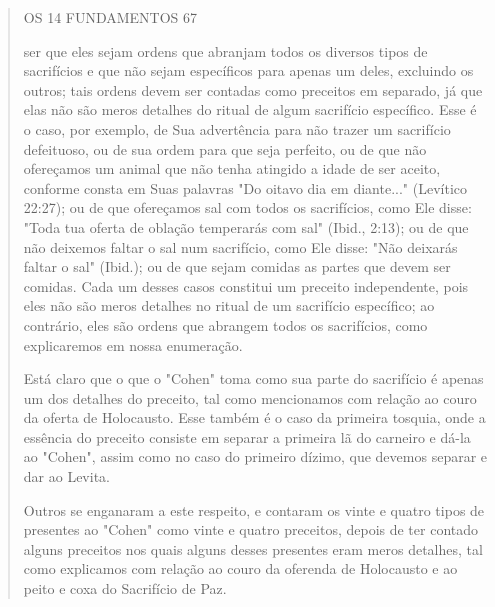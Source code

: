 \begin{quote}
OS 14 FUNDAMENTOS 67

ser que eles sejam ordens que abranjam todos os diversos tipos de
sacrifícios e que não sejam específicos para apenas um deles, excluindo
os outros; tais or­dens devem ser contadas como preceitos em separado,
já que elas não são me­ros detalhes do ritual de algum sacrifício
específico. Esse é o caso, por exem­plo, de Sua advertência para não
trazer um sacrifício defeituoso, ou de sua or­dem para que seja
perfeito, ou de que não ofereçamos um animal que não te­nha atingido a
idade de ser aceito, conforme consta em Suas palavras "Do oita­vo dia em
diante..." (Levítico 22:27); ou de que ofereçamos sal com todos os
sacrifícios, como Ele disse: "Toda tua oferta de oblação temperarás com
sal" (Ibid., 2:13); ou de que não deixemos faltar o sal num sacrifício,
como Ele dis­se: "Não deixarás faltar o sal" (Ibid.); ou de que sejam
comidas as partes que devem ser comidas. Cada um desses casos constitui
um preceito independen­te, pois eles não são meros detalhes no ritual de
um sacrifício específico; ao contrário, eles são ordens que abrangem
todos os sacrifícios, como explicare­mos em nossa enumeração.

Está claro que o que o "Cohen" toma como sua parte do sacrifício é
apenas um dos detalhes do preceito, tal como mencionamos com relação ao
couro da oferta de Holocausto. Esse também é o caso da primeira tosquia,
on­de a essência do preceito consiste em separar a primeira lã do
carneiro e dá-la ao "Cohen", assim como no caso do primeiro dízimo, que
devemos separar e dar ao Levita.

Outros se enganaram a este respeito, e contaram os vinte e quatro tipos
de presentes ao "Cohen" como vinte e quatro preceitos, depois de ter
contado alguns preceitos nos quais alguns desses presentes eram meros
deta­lhes, tal como explicamos com relação ao couro da oferenda de
Holocausto e ao peito e coxa do Sacrifício de Paz.


\end{quote}
